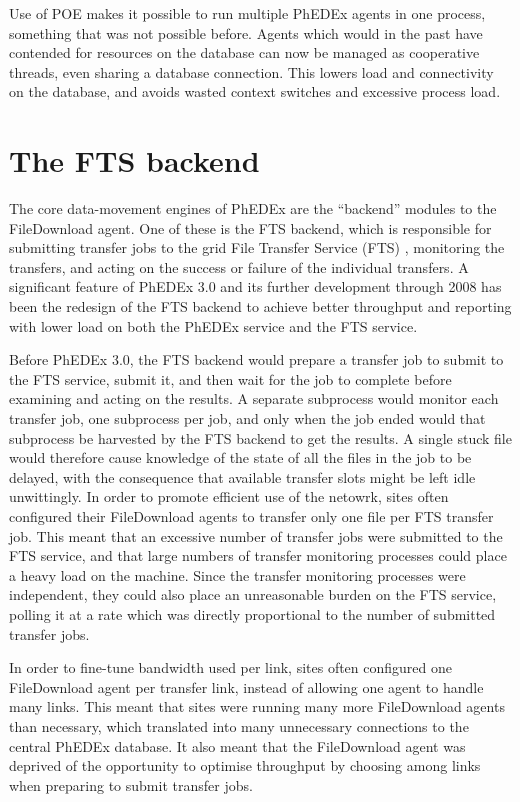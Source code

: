 \documentclass{PoS}
\begin{document}
Use of POE makes it possible to run multiple PhEDEx agents in one
process, something that was not possible before. Agents which would in
the past have contended for resources on the database can now be
managed as cooperative threads, even sharing a database
connection. This lowers load and connectivity on the database, and
avoids wasted context switches and excessive process load.

\section{The FTS backend}

The core data-movement engines of PhEDEx are the ``backend'' modules to
the FileDownload agent. One of these is the FTS backend, which is
responsible for submitting transfer jobs to the grid File Transfer
Service (FTS) \cite{fts}, monitoring the transfers, and acting on the
success or failure of the individual transfers. A significant feature
of PhEDEx 3.0 and its further development through 2008 has been the
redesign of the FTS backend to achieve better throughput and reporting
with lower load on both the PhEDEx service and the FTS service.

Before PhEDEx 3.0, the FTS backend would prepare a transfer job to
submit to the FTS service, submit it, and then wait for the job to complete
before examining and acting on the results. A separate subprocess
would monitor each transfer job, one subprocess per job, and only when
the job ended would that subprocess be harvested by the FTS backend to
get the results. A single stuck file would therefore cause knowledge
of the state of all the files in the job to be delayed, with the
consequence that available transfer slots might be left idle
unwittingly. In order to promote efficient use of the netowrk, sites
often configured their FileDownload agents to transfer only one file
per FTS transfer job. This meant that an excessive number of
transfer jobs were submitted to the FTS service, and that large
numbers of transfer monitoring processes could place a heavy load on
the machine. Since the transfer monitoring processes were
independent, they could also place an unreasonable burden on the FTS
service, polling it at a rate which was directly proportional to the
number of submitted transfer jobs.

In order to fine-tune bandwidth used per link, sites often configured
one FileDownload agent per transfer link, instead of allowing one
agent to handle many links. This meant that sites were running many
more FileDownload agents than necessary, which translated into many
unnecessary connections to the central PhEDEx database. It also meant
that the FileDownload agent was deprived of the opportunity to
optimise throughput by choosing among links when preparing to submit
transfer jobs.
\end{document}
